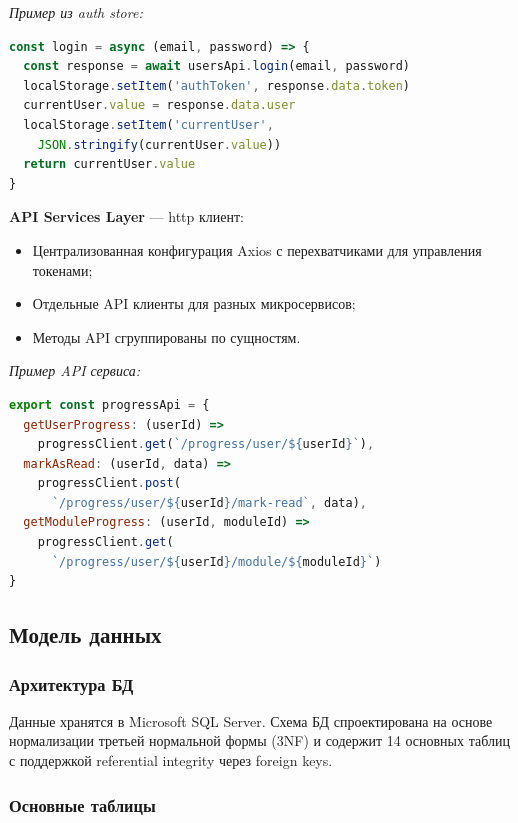 \textit{Пример из auth store:}
\begin{lstlisting}[language=JavaScript, basicstyle=\ttfamily\small]
const login = async (email, password) => {
  const response = await usersApi.login(email, password)
  localStorage.setItem('authToken', response.data.token)
  currentUser.value = response.data.user
  localStorage.setItem('currentUser', 
    JSON.stringify(currentUser.value))
  return currentUser.value
}
\end{lstlisting}

\textbf{API Services Layer} --- http клиент:
\begin{itemize}
    \item Централизованная конфигурация Axios с перехватчиками для управления токенами;
    \item Отдельные API клиенты для разных микросервисов;
    \item Методы API сгруппированы по сущностям.
\end{itemize}

\textit{Пример API сервиса:}
\begin{lstlisting}[language=JavaScript, basicstyle=\ttfamily\small]
export const progressApi = {
  getUserProgress: (userId) => 
    progressClient.get(`/progress/user/${userId}`),
  markAsRead: (userId, data) => 
    progressClient.post(
      `/progress/user/${userId}/mark-read`, data),
  getModuleProgress: (userId, moduleId) => 
    progressClient.get(
      `/progress/user/${userId}/module/${moduleId}`)
}
\end{lstlisting}


\subsection{Модель данных}

\subsubsection{Архитектура БД}

Данные хранятся в Microsoft SQL Server. Схема БД спроектирована на основе нормализации третьей нормальной формы (3NF) и содержит 14 основных таблиц с поддержкой referential integrity через foreign keys.

\subsubsection{Основные таблицы}

